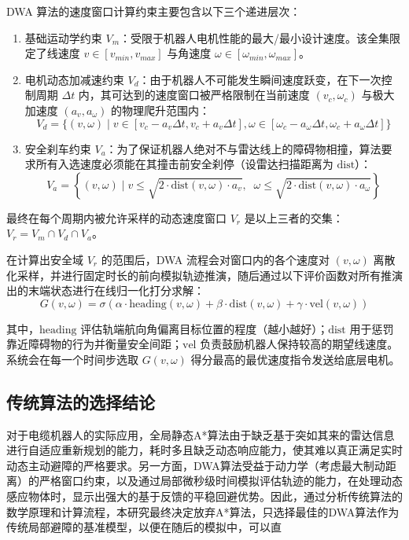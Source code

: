 DWA 算法的速度窗口计算约束主要包含以下三个递进层次：
\begin{enumerate}
    \item 基础运动学约束 $V_m$：受限于机器人电机性能的最大/最小设计速度。该全集限定了线速度 $v \in [v_{min}, v_{max}]$ 与角速度 $\omega \in [\omega_{min}, \omega_{max}]$。
    \item 电机动态加减速约束 $V_d$：由于机器人不可能发生瞬间速度跃变，在下一次控制周期 $\Delta t$ 内，其可达到的速度窗口被严格限制在当前速度 $(v_c, \omega_c)$ 与极大加速度 $(a_v, a_\omega)$ 的物理爬升范围内：
    \begin{equation}
        V_d = \{ (v, \omega) \mid v \in [v_c - a_v \Delta t, v_c + a_v \Delta t], \omega \in [\omega_c - a_\omega \Delta t, \omega_c + a_\omega \Delta t] \}
    \end{equation}
    \item 安全刹车约束 $V_a$：为了保证机器人绝对不与雷达线上的障碍物相撞，算法要求所有入选速度必须能在其撞击前安全刹停（设雷达扫描距离为 $\text{dist}$）：
    \begin{equation}
        V_a = \left\{ (v, \omega) \mid v \le \sqrt{2 \cdot \text{dist}(v, \omega) \cdot a_v}, \;\; \omega \le \sqrt{2 \cdot \text{dist}(v, \omega) \cdot a_\omega} \right\}
    \end{equation}
\end{enumerate}

最终在每个周期内被允许采样的动态速度窗口 $V_r$ 是以上三者的交集：$V_r = V_m \cap V_d \cap V_a$。

在计算出安全域 $V_r$ 的范围后，DWA 流程会对窗口内的各个速度对 $(v, \omega)$ 离散化采样，并进行固定时长的前向模拟轨迹推演，随后通过以下评价函数对所有推演出的末端状态进行在线归一化打分求解：
\begin{equation}
    G(v, \omega) = \sigma \left( \alpha \cdot \text{heading}(v, \omega) + \beta \cdot \text{dist}(v, \omega) + \gamma \cdot \text{vel}(v, \omega) \right)
\end{equation}

其中，$\text{heading}$ 评估轨端航向角偏离目标位置的程度（越小越好）；$\text{dist}$ 用于惩罚靠近障碍物的行为并衡量安全间距；$\text{vel}$ 负责鼓励机器人保持较高的期望线速度。系统会在每一个时间步选取 $G(v, \omega)$ 得分最高的最优速度指令发送给底层电机。
\subsection{传统算法的选择结论}

对于电缆机器人的实际应用，全局静态A*算法由于缺乏基于突如其来的雷达信息进行自适应重新规划的能力，耗时多且缺乏动态响应能力，使其难以真正满足实时动态主动避障的严格要求。另一方面，DWA算法受益于动力学（考虑最大制动距离）的严格窗口约束，以及通过局部微秒级时间模拟评估轨迹的能力，在处理动态感应物体时，显示出强大的基于反馈的平稳回避优势。\cite{gong2024local,jin2023robot}因此，通过分析传统算法的数学原理和计算流程，本研究最终决定放弃A*算法，只选择最佳的DWA算法作为传统局部避障的基准模型，以便在随后的模拟中，可以直
